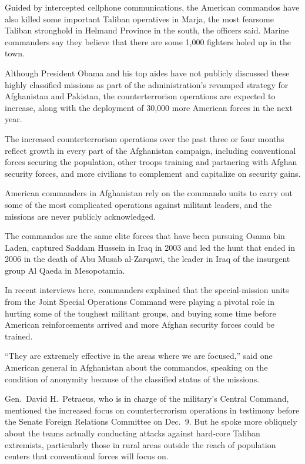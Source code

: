 ﻿\documentclass[12pt]{article}
\begin{document}
Guided by intercepted cellphone communications, the American commandos have also killed some
important Taliban operatives in Marja, the most fearsome Taliban stronghold in Helmand Province in
the south, the officers said. Marine commanders say they believe that there are some 1,000 fighters
holed up in the town.

Although President Obama and his top aides have not publicly discussed these highly classified
missions as part of the administration's revamped strategy for Afghanistan and Pakistan, the
counterterrorism operations are expected to increase, along with the deployment of 30,000 more
American forces in the next year.

The increased counterterrorism operations over the past three or four months reflect growth in every
part of the Afghanistan campaign, including conventional forces securing the population, other
troops training and partnering with Afghan security forces, and more civilians to complement and
capitalize on security gains.

American commanders in Afghanistan rely on the commando units to carry out some of the most
complicated operations against militant leaders, and the missions are never publicly acknowledged.

The commandos are the same elite forces that have been pursuing Osama bin Laden, captured Saddam
Hussein in Iraq in 2003 and led the hunt that ended in 2006 in the death of Abu Musab al-Zarqawi,
the leader in Iraq of the insurgent group Al Qaeda in Mesopotamia.

In recent interviews here, commanders explained that the special-mission units from the Joint
Special Operations Command were playing a pivotal role in hurting some of the toughest militant
groups, and buying some time before American reinforcements arrived and more Afghan security forces
could be trained.

``They are extremely effective in the areas where we are focused,'' said one American general in
Afghanistan about the commandos, speaking on the condition of anonymity because of the classified
status of the missions.

Gen.~David H.~Petraeus, who is in charge of the military's Central Command, mentioned the increased
focus on counterterrorism operations in testimony before the Senate Foreign Relations Committee on
Dec.~9. But he spoke more obliquely about the teams actually conducting attacks against hard-core
Taliban extremists, particularly those in rural areas outside the reach of population centers that
conventional forces will focus on.
\end{document}
